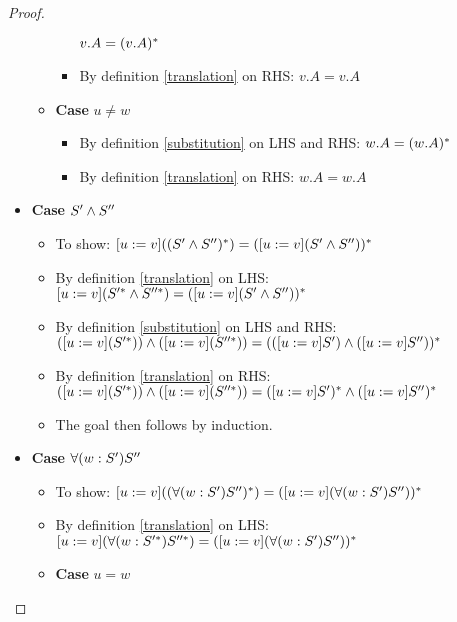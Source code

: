 \begin{proof}
\begin{itemize}
\begin{itemize}
\begin{itemize}
                    $v.A = (v.A)^{*}$
                \item By definition \ref{translation} on RHS: $v.A = v.A$
            \end{itemize}
            \item \textbf{Case} $u \neq w$
            \begin{itemize}
                \item By definition \ref{substitution} on LHS and RHS:
                    $w.A = (w.A)^{*}$
                \item By definition \ref{translation} on RHS: $w.A = w.A$
            \end{itemize}
        \end{itemize}
        \item \textbf{Case} $S' \wedge S''$
        \begin{itemize}
            \item To show: $[u := v]((S' \wedge S'')^{*}) =
                ([u := v](S' \wedge S''))^{*}$
            \item By definition \ref{translation} on LHS:
                $[u := v](S'^{*} \wedge S''^{*}) =
                ([u := v](S' \wedge S''))^{*}$
            \item By definition \ref{substitution} on LHS and RHS: \\
                $([u := v](S'^{*})) \wedge ([u := v](S''^{*}))
                = (([u := v]S') \wedge ([u := v]S''))^{*}$
            \item By definition \ref{translation} on RHS: \\
                $([u := v](S'^{*})) \wedge ([u := v](S''^{*}))
                = ([u := v]S')^{*} \wedge ([u := v]S'')^{*}$
            \item The goal then follows by induction.
        \end{itemize}
        \item \textbf{Case} $\forall(w:S')S''$
        \begin{itemize}
            \item To show: $[u := v]((\forall(w:S')S'')^{*}) =
                ([u := v](\forall(w:S')S''))^{*}$
            \item By definition \ref{translation} on LHS:
                $[u := v](\forall(w:S'^{*})S''^{*}) =
                ([u := v](\forall(w:S')S''))^{*}$
            \item \textbf{Case} $u = w$

\end{itemize}
\end{itemize}
\end{proof}
